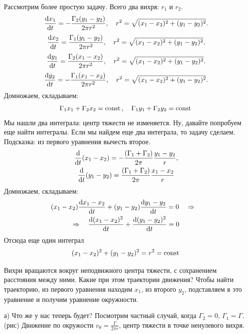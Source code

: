 Рассмотрим более простую задачу. Всего два вихря: $r_1$ и $r_2$.
\begin{equation}
	\dv{x_1}{t}=-\frac{\Gamma_2 (y_1-y_2)}{2\pi r^2}, \quad r^2=\sqrt{(x_1-x_2)^2+(y_1-y_2)^2}.
\end{equation}
\begin{equation}
	\dv{x_2}{t}=\frac{\Gamma_1 (y_1-y_2)}{2\pi r^2}, \quad r^2=\sqrt{(x_1-x_2)^2+(y_1-y_2)^2}.
\end{equation}
\begin{equation}
	\dv{y_1}{t}=\frac{\Gamma_2 (x_1-x_2)}{2\pi r^2}, \quad r^2=\sqrt{(x_1-x_2)^2+(y_1-y_2)^2}.
\end{equation}
\begin{equation}
	\dv{y_2}{t}=-\frac{\Gamma_1 (x_1-x_2)}{2\pi r^2}, \quad r^2=\sqrt{(x_1-x_2)^2+(y_1-y_2)^2}.
\end{equation}
Домножаем, складываем:
\begin{equation}
	\Gamma_1 x_1 + \Gamma_2 x_2=\mathrm{const}\,, \quad
	\Gamma_1 y_1 + \Gamma_2 y_2=\mathrm{const}\,
\end{equation}
Мы нашли два интеграла: центр тяжести не изменяется.
Ну, давайте попробуем еще найти интегралы. Если мы найдем еще два интеграла, то задачу сделаем. Подсказка: из первого уравнения вычесть второе.
\begin{gather}
	\dv{t}\qty(x_1-x_2)=-\frac{\qty(\Gamma_1+ \Gamma_2)}{2\pi}\frac{y_1-y_2}{r},\\
	\dv{t}\qty(y_1-y_2)=\frac{\qty(\Gamma_1+ \Gamma_2)}{2\pi}\frac{x_1-x_2}{r}
\end{gather}
Домножаем, складываем:
\begin{gather}
	(x_1-x_2)\dv{x_1-x_2}{t}+(y_1-y_2)\dv{y_1-y_2}{t}=0 \quad \Rightarrow \quad \\ \Rightarrow\quad
	\dv{(x_1-x_2)^2}{t}+\dv{(y_1-y_2)^2}{t}=0
\end{gather}
Отсюда еще один интеграл
\begin{equation}
	(x_1-x_2)^2+(y_1-y_2)^2=r^2=\mathrm{const}\,	
\end{equation}

Вихри вращаются вокруг неподвижного центра тяжести, с сохранением расстояния между ними. Какие при этом траектории движения? Чтобы найти траекторию, из первого уравнения находим $x_1$, из второго $y_2$, подставляем в это уравнение и получим уравнение окружности.

а) Что же у нас теперь будет? Посмотрим частный случай, когда $\Gamma_2=0$, $\Gamma_1=\Gamma$. (рис) Движение по окружости $v_\theta=\frac{\Gamma}{2\pi r}$, центр тяжести в точке ненулевого вихря.

